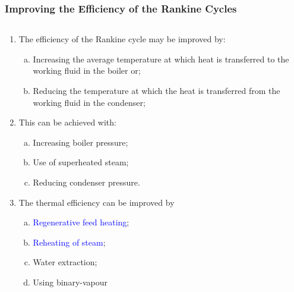 \documentclass[10pt,compress]{beamer}
\newcommand{\blue}{\textcolor{blue}}
\begin{document}
\begin{frame}
 \frametitle{Improving the Efficiency of the Rankine Cycles}
   \begin{columns}
      \begin{column}[c]{0.5\linewidth}
         \begin{enumerate}\scriptsize
            \item<1-> The efficiency of the Rankine cycle may be improved by:
              \begin{enumerate}[(a)]\scriptsize
                 \item <1-> Increasing the average temperature at which heat is transferred to the working fluid in the boiler or;
                 \item <1-> Reducing the temperature at which the heat is transferred from the working fluid in the condenser;
              \end{enumerate} 
            \item <2-> This can be achieved with:
              \begin{enumerate}[(a)]\scriptsize
                 \item <2-> Increasing boiler pressure;
                 \item <2-> Use of superheated steam;
                 \item <2-> Reducing condenser pressure.
              \end{enumerate}
            \item <3-> The thermal efficiency can be improved by
              \begin{enumerate}[(a)]\scriptsize
                 \item <3-> \blue{Regenerative feed heating};
                 \item <3-> \blue{Reheating of steam};
                 \item <3-> Water extraction;
                 \item <3-> Using binary-vapour
              \end{enumerate}
         \end{enumerate}  
      \end{column}
      \begin{column}[c]{0.5\linewidth}
\end{column}
\end{columns}
\end{frame}
\end{document}
